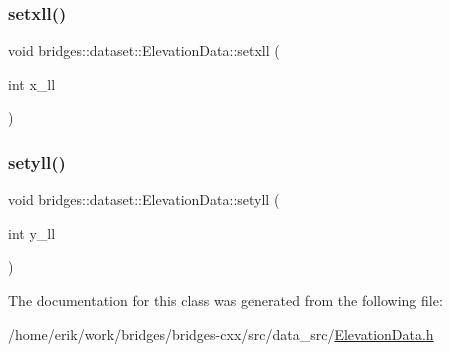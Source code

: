 \mbox{\label{classbridges_1_1dataset_1_1_elevation_data_a95e5b02c45c547908612e83641eb386c}} 
\subsubsection{\texorpdfstring{setxll()}{setxll()}}
{\footnotesize\ttfamily void bridges\+::dataset\+::\+Elevation\+Data\+::setxll (\begin{DoxyParamCaption}\item[{int}]{x\+\_\+ll }\end{DoxyParamCaption})\hspace{0.3cm}{\ttfamily [inline]}}

\mbox{\label{classbridges_1_1dataset_1_1_elevation_data_a4ea6e380b7cc1531a0ae9b593dd98843}} 
\subsubsection{\texorpdfstring{setyll()}{setyll()}}
{\footnotesize\ttfamily void bridges\+::dataset\+::\+Elevation\+Data\+::setyll (\begin{DoxyParamCaption}\item[{int}]{y\+\_\+ll }\end{DoxyParamCaption})\hspace{0.3cm}{\ttfamily [inline]}}



The documentation for this class was generated from the following file\+:\begin{DoxyCompactItemize}
\item 
/home/erik/work/bridges/bridges-\/cxx/src/data\+\_\+src/\hyperlink{_elevation_data_8h}{Elevation\+Data.\+h}\end{DoxyCompactItemize}
